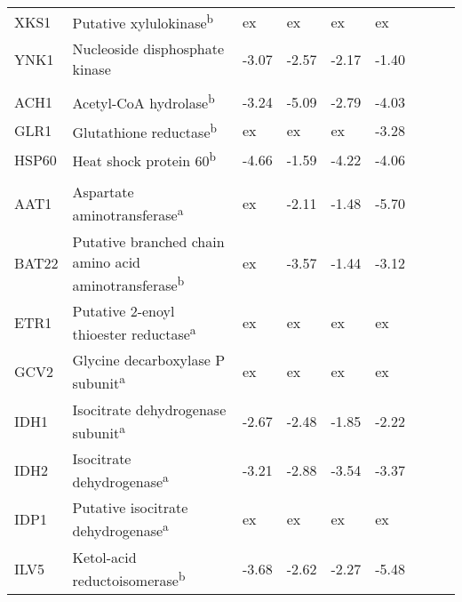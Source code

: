 \begin{ThreePartTable}
\begin{longtable}[t]{lllllllll}
\hspace{1em}XKS1 & Putative xylulokinase\textsuperscript{b} & ex & ex & ex & ex &  &  & \\
\hspace{1em}YNK1 & Nucleoside disphosphate kinase & -3.07 & -2.57 & -2.17 & -1.40 &  &  & \\
\addlinespace[0.3em]
\multicolumn{9}{l}{\textbf{Cytosol and mitochondria}}\\
\hspace{1em}ACH1 & Acetyl-CoA hydrolase\textsuperscript{b} & -3.24 & -5.09 & -2.79 & -4.03 &  &  & \\
\hspace{1em}GLR1 & Glutathione reductase\textsuperscript{b} & ex & ex & ex & -3.28 &  &  & \\
\hspace{1em}HSP60 & Heat shock protein 60\textsuperscript{b} & -4.66 & -1.59 & -4.22 & -4.06 &  &  & \\
\addlinespace[0.3em]
\multicolumn{9}{l}{\textbf{Mitochondria}}\\
\hspace{1em}AAT1 & Aspartate aminotransferase\textsuperscript{a} & ex & -2.11 & -1.48 & -5.70 &  &  & \\
\hspace{1em}BAT22 & Putative branched chain amino acid aminotransferase\textsuperscript{b} & ex & -3.57 & -1.44 & -3.12 &  &  & \\
\hspace{1em}ETR1 & Putative 2-enoyl thioester reductase\textsuperscript{a} & ex & ex & ex & ex &  &  & \\
\hspace{1em}GCV2 & Glycine decarboxylase P subunit\textsuperscript{a} & ex & ex & ex & ex &  &  & \\
\hspace{1em}IDH1 & Isocitrate dehydrogenase subunit\textsuperscript{a} & -2.67 & -2.48 & -1.85 & -2.22 &  &  & \\
\hspace{1em}IDH2 & Isocitrate dehydrogenase\textsuperscript{a} & -3.21 & -2.88 & -3.54 & -3.37 &  &  & \\
\hspace{1em}IDP1 & Putative isocitrate dehydrogenase\textsuperscript{a} & ex & ex & ex & ex &  &  & \\
\hspace{1em}ILV5 & Ketol-acid reductoisomerase\textsuperscript{b} & -3.68 & -2.62 & -2.27 & -5.48 &  &  & \\

\end{longtable}
\end{ThreePartTable}

